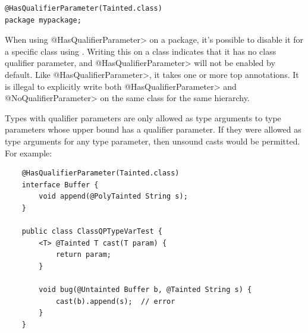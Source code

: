 \begin{Verbatim}
@HasQualifierParameter(Tainted.class)
package mypackage;
\end{Verbatim}

When using \<@HasQualifierParameter> on a package, it's possible to disable it
for a specific class using .
Writing this on a class indicates that it has no class qualifier parameter, and
\<@HasQualifierParameter> will not be enabled by default. Like
\<@HasQualifierParameter>, it takes one or more top annotations. It is illegal
to explicitly write both \<@HasQualifierParameter> and \<@NoQualifierParameter>
on the same class for the same hierarchy.

%
%
%


Types with qualifier parameters are only allowed as type arguments to type parameters whose upper bound
has a qualifier parameter. If they were allowed as type arguments for any type parameter, then
unsound casts would be permitted. For example:

\begin{Verbatim}
    @HasQualifierParameter(Tainted.class)
    interface Buffer {
        void append(@PolyTainted String s);
    }

    public class ClassQPTypeVarTest {
        <T> @Tainted T cast(T param) {
            return param;
        }

        void bug(@Untainted Buffer b, @Tainted String s) {
            cast(b).append(s);  // error
        }
    }


\end{Verbatim}

